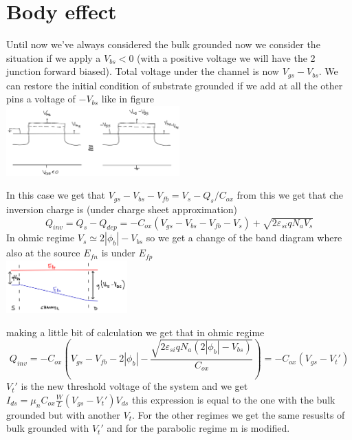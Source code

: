 \section{Body effect}
Until now we've always considered the bulk grounded now we consider the situation if we apply a $V_{bs}<0$ (with a positive voltage we will have the 2 junction forward biased). Total voltage under the channel is now $V_{gs}-V_{bs}$. We can restore the initial condition of substrate grounded if we add at all the other pins a voltage of $-V_{bs}$ like in figure\\

\centering
\includegraphics[width=0.5\textwidth]{body1.png}\\
\raggedright

In this case we get that $V_{gs}-V_{bs}-V_{fb}=V_s-Q_s/C_{ox}$ from this we get that che inversion charge is (under charge sheet approximation) 
\begin{equation}
Q_{inv}=Q_s-Q_{dep}=-C_{ox}(V_{gs}-V_{bs}-V_{fb}-V_s)+\sqrt{2\varepsilon_{si}qN_aV_s}
\end{equation}
In ohmic regime $V_s\simeq 2|\phi_b|-V_{bs}$ so we get a change of the band diagram where also at the source $E_{fn}$ is under $E_{fp}$ \\

\centering
\includegraphics[width=0.35\textwidth]{body2.png}\\
\raggedright

making a little bit of calculation we get that in ohmic regime
\begin{equation}
Q_{inv}=-C_{ox}(V_{gs}-V_{fb}-2|\phi_b|-\frac{\sqrt{2\varepsilon_{si}qN_a(2|\phi_b|-V_{bs})}}{C_{ox}})=-C_{ox}(V_{gs}-V_t')
\end{equation}
$V_t'$ is the new threshold voltage of the system and we get $I_{ds}=\mu_nC_{ox}\frac{W}{L}(V_{gs}-V_t')V_{ds}$ this expression is equal to the one with the bulk grounded but with another $V_t$. For the other regimes we get the same resuslts of bulk grounded with $V_t'$ and for the parabolic regime m is modified.\\

